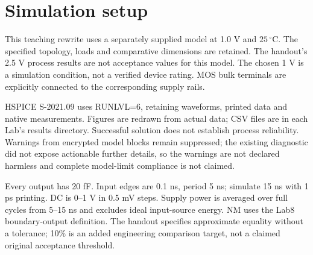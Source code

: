 \section{Simulation setup}
This teaching rewrite uses a separately supplied model at 1.0 V and $25\,^{\circ}\mathrm C$. The specified topology, loads and comparative dimensions are retained. The handout's 2.5 V process results are not acceptance values for this model. The chosen 1 V is a simulation condition, not a verified device rating. MOS bulk terminals are explicitly connected to the corresponding supply rails.

HSPICE S-2021.09 uses RUNLVL=6, retaining waveforms, printed data and native measurements. Figures are redrawn from actual data; CSV files are in each Lab's results directory. Successful solution does not establish process reliability. Warnings from encrypted model blocks remain suppressed; the existing diagnostic did not expose actionable further details, so the warnings are not declared harmless and complete model-limit compliance is not claimed.

Every output has 20 fF. Input edges are 0.1 ns, period 5 ns; simulate 15 ns with 1 ps printing. DC is 0--1 V in 0.5 mV steps. Supply power is averaged over full cycles from 5--15 ns and excludes ideal input-source energy. NM uses the Lab8 boundary-output definition. The handout specifies approximate equality without a tolerance; 10\% is an added engineering comparison target, not a claimed original acceptance threshold.

